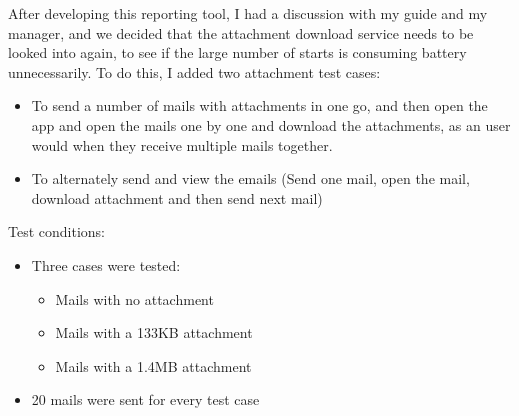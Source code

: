 After developing this reporting tool, I had a discussion with my guide and my manager, and we decided that the attachment download service needs to be looked into again, to see if the large number of starts is consuming battery unnecessarily. To do this, I added two attachment test cases:
\begin{itemize}
	\item To send a number of mails with attachments in one go, and then open the app and open the mails one by one and download the attachments, as an user would when they receive multiple mails together.
	\item To alternately send and view the emails (Send one mail, open the mail, download attachment and then send next mail)
\end{itemize}
Test conditions:
\begin{itemize}
	\item Three cases were tested:
	\begin{itemize}
		\item Mails with no attachment
		\item Mails with a 133KB attachment
		\item Mails with a 1.4MB attachment
	\end{itemize}
	\item 20 mails were sent for every test case
\end{itemize}

